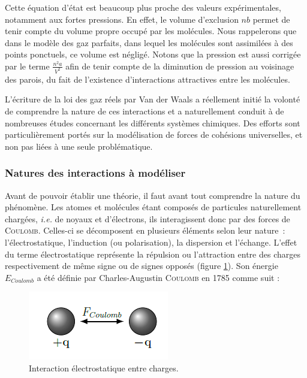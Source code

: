 Cette équation d'état est beaucoup plus proche des valeurs expérimentales, notamment aux fortes pressions. En effet, le volume d'exclusion $nb$ permet de tenir compte du volume propre occupé par les molécules. Nous rappelerons que dans le modèle des gaz parfaits, dans lequel les molécules sont assimilées à des points ponctuels, ce volume est négligé. Notons que la pression est aussi corrigée par le terme $\frac{n^{2}a}{V^{2}}$ afin de tenir compte de la diminution de pression au voisinage des parois, du fait de l'existence d'interactions attractives entre les molécules.

L'écriture de la loi des \og gaz réels \fg{} par Van der Waals a réellement initié la volonté de comprendre la nature de ces interactions et a naturellement conduit à de nombreuses études concernant les différents systèmes chimiques. Des efforts sont particulièrement portés sur la modélisation de forces de cohésions universelles, et non pas liées à une seule problématique.

\subsubsection{Natures des interactions à modéliser}

Avant de pouvoir établir une théorie, il faut avant tout comprendre la nature du phénomène. Les atomes et molécules étant composés de particules naturellement chargées, \textit{i.e.} de noyaux et d'électrons, ils interagissent donc par des forces de \textsc{Coulomb}. Celles-ci se décomposent en plusieurs éléments selon leur nature~: l'électrostatique, l'induction (ou polarisation), la dispersion et l'échange.
L'effet du terme électrostatique représente la répulsion ou l'attraction entre des charges respectivement de même signe ou de signes opposés (figure \ref{chargecharge}). Son énergie $E_{Coulomb}$ a été définie par Charles-Augustin \textsc{Coulomb} en 1785 comme suit :

\begin{figure}[h]
	\centering
\includegraphics[scale=0.5]{image/chargecharge}	
\caption{Interaction électrostatique entre charges.}
\label{chargecharge}
\end{figure}



